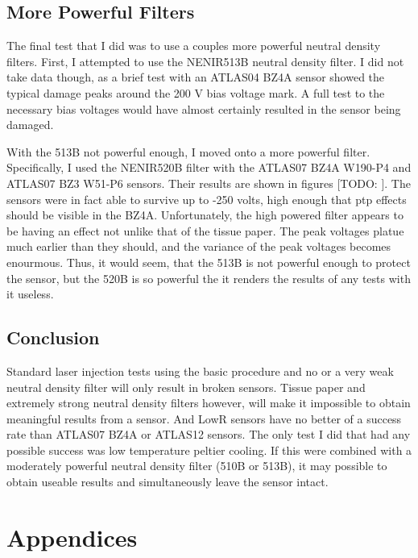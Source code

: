 \documentclass{report}
\begin{document}
        \section{More Powerful Filters} \label{sect:new_filters}
            The final test that I did was to use a couples more powerful neutral density filters. First, I attempted to use the NENIR513B neutral density filter. I did not take data though, as a brief test with an ATLAS04 BZ4A sensor showed the typical damage peaks around the 200 V bias voltage mark. A full test to the necessary bias voltages would have almost certainly resulted in the sensor being damaged.  

            With the 513B not powerful enough, I moved onto a more powerful filter. Specifically, I used the NENIR520B filter with the ATLAS07 BZ4A W190-P4 and ATLAS07 BZ3 W51-P6 sensors. Their results are shown in figures [TODO:
            ]. The sensors were in fact able to survive up to -250 volts, high enough that ptp effects should be visible in the BZ4A. Unfortunately, the high powered filter appears to be having an effect not unlike that of the tissue paper. The peak voltages platue much earlier than they should, and the variance of the peak voltages becomes enourmous. Thus, it would seem, that the 513B is not powerful enough to protect the sensor, but the 520B is so powerful the it renders the results of any tests with it useless.



        \section{Conclusion}
            Standard laser injection tests using the basic procedure and no or a very weak neutral density filter will only result in broken sensors. Tissue paper and extremely strong neutral density filters however, will make it impossible to obtain meaningful results from a sensor. And LowR sensors have no better of a success rate than ATLAS07 BZ4A or ATLAS12 sensors. The only test I did that had any possible success was low temperature peltier cooling. If this were combined with a moderately powerful neutral density filter (510B or 513B), it may possible to obtain useable results and simultaneously leave the sensor intact. 
            





    \chapter{Appendices}
\end{document}
